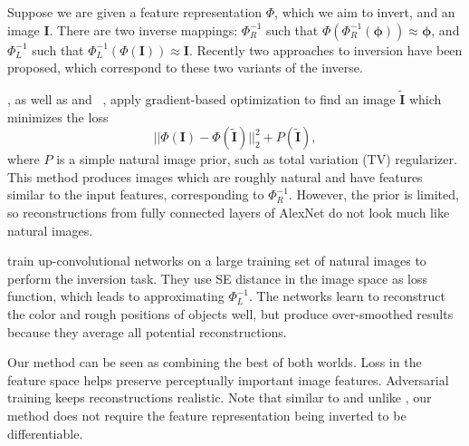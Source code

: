 \documentclass{article}
\newcommand{\img}{\mathbf{I}}
\newcommand{\feat}{\mathbf{\phi}}
\newcommand{\recimg}{\widetilde{\img}}
\newcommand{\repres}{\Phi}
\newcommand{\prior}{P}
\newcommand{\ltwo}{SE }
\begin{document}
Suppose we are given a feature representation $\repres$, which we aim to invert, and an image $\img$.
There are two inverse mappings: $\repres^{-1}_R$ such that $\repres(\repres^{-1}_R(\feat)) \approx \feat$, and $\repres^{-1}_L$ such that $\repres^{-1}_L (\repres (\img)) \approx \img$.
Recently two approaches to inversion have been proposed, which correspond to these two variants of the inverse.

\citet{Mahendran_CVPR2015}, as well as \citet{Simonyan_ICLR2014} and ~\citet{Yosinski_2015}, apply gradient-based optimization to find an image $\recimg$ which minimizes the loss 
\begin{equation}
 ||\repres(\img) - \repres(\recimg)||_2^2 + \prior (\recimg),
\end{equation}
where $\prior$ is a simple natural image prior, such as total variation (TV) regularizer.
This method produces images which are roughly natural and have features similar to the input features, corresponding to $\repres^{-1}_R$.
However, the prior is limited, so reconstructions from fully connected layers of AlexNet do not look much like natural images.

\citet{our_inverting} train up-convolutional networks on a large training set of natural images to perform the inversion task.
They use \ltwo distance in the image space as loss function, which leads to approximating $\repres^{-1}_L$.
The networks learn to reconstruct the color and rough positions of objects well, but produce over-smoothed results because they average all potential reconstructions.

Our method can be seen as combining the best of both worlds.
Loss in the feature space helps preserve perceptually important image features.
Adversarial training keeps reconstructions realistic.
Note that similar to \citet{our_inverting} and unlike \citet{Mahendran_CVPR2015}, our method 
does not require the feature representation being inverted to be differentiable.
\end{document}

